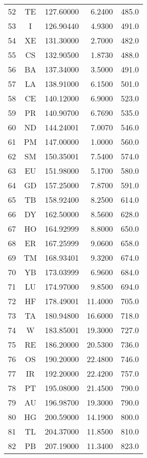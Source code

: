 \begin{longtable}{|rcrrr|}
52 & TE     &127.60000 &  6.2400    &485.0 \\
53 & I      &126.90440 &  4.9300    &491.0 \\
54 & XE     &131.30000 &  2.7000    &482.0 \\
55 & CS     &132.90500 &  1.8730    &488.0 \\
56 & BA     &137.34000 &  3.5000    &491.0 \\
57 & LA     &138.91000 &  6.1500    &501.0 \\
58 & CE     &140.12000 &  6.9000    &523.0 \\
59 & PR     &140.90700 &  6.7690    &535.0 \\
60 & ND     &144.24001 &  7.0070    &546.0 \\
61 & PM     &147.00000 &  1.0000    &560.0 \\
62 & SM     &150.35001 &  7.5400    &574.0 \\
63 & EU     &151.98000 &  5.1700    &580.0 \\
64 & GD     &157.25000 &  7.8700    &591.0 \\
65 & TB     &158.92400 &  8.2500    &614.0 \\
66 & DY     &162.50000 &  8.5600    &628.0 \\
67 & HO     &164.92999 &  8.8000    &650.0 \\
68 & ER     &167.25999 &  9.0600    &658.0 \\
69 & TM     &168.93401 &  9.3200    &674.0 \\
70 & YB     &173.03999 &  6.9600    &684.0 \\
71 & LU     &174.97000 &  9.8500    &694.0 \\
72 & HF     &178.49001 & 11.4000    &705.0 \\
73 & TA     &180.94800 & 16.6000    &718.0 \\
74 & W      &183.85001 & 19.3000    &727.0 \\
75 & RE     &186.20000 & 20.5300    &736.0 \\
76 & OS     &190.20000 & 22.4800    &746.0 \\
77 & IR     &192.20000 & 22.4200    &757.0 \\
78 & PT     &195.08000 & 21.4500    &790.0 \\
79 & AU     &196.98700 & 19.3000    &790.0 \\
80 & HG     &200.59000 & 14.1900    &800.0 \\
81 & TL     &204.37000 & 11.8500    &810.0 \\
82 & PB     &207.19000 & 11.3400    &823.0 \\

\end{longtable}
